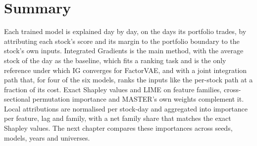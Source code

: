 \section{Summary}
\label{sec:xm_summary}

Each trained model is explained day by day, on the days its portfolio trades, by attributing each stock's score and its margin to the portfolio boundary to the stock's own inputs. Integrated Gradients is the main method, with the average stock of the day as the baseline, which fits a ranking task and is the only reference under which IG converges for FactorVAE, and with a joint integration path that, for four of the six models, ranks the inputs like the per-stock path at a fraction of its cost. Exact Shapley values and LIME on feature families, cross-sectional permutation importance and MASTER's own weights complement it. Local attributions are normalised per stock-day and aggregated into importance per feature, lag and family, with a net family share that matches the exact Shapley values. The next chapter compares these importances across seeds, models, years and universes.
